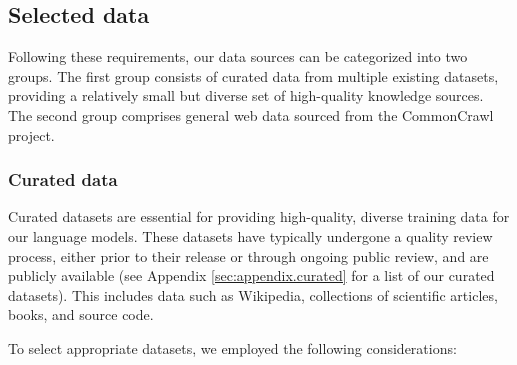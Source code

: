 \subsection{Selected data}
\label{sec:datasets.selection}

Following these requirements, our data sources can be categorized into two groups. The first group consists of curated data from multiple existing datasets, providing a relatively small but diverse set of high-quality knowledge sources. The second group comprises general web data sourced from the CommonCrawl project. 

\subsubsection{Curated data}
\label{sec:datasets.selection.curated}

Curated datasets are essential for providing high-quality, diverse training data for our language models. These datasets have typically undergone a quality review process, either prior to their release or through ongoing public review,
and are publicly available
(see Appendix \ref{sec:appendix.curated} for a list of our curated datasets). This includes data such as Wikipedia, collections of 
scientific articles, books, and source code.

To select appropriate datasets, we employed the following considerations:

